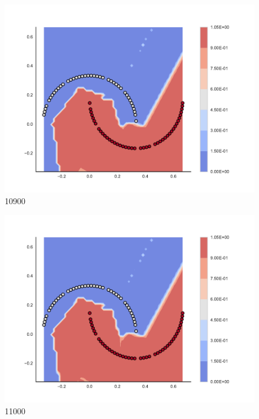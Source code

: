 \begin{subfigure}[b]{0.09\textwidth}
    \includegraphics[clip, trim=2.35cm 1.75cm 4.5cm 0cm,width=\textwidth]{img/convergence/10900.pdf}
    \caption{10900}
    \label{fig:convergence_10900}
\end{subfigure}
%
\begin{subfigure}[b]{0.09\textwidth}
    \includegraphics[clip, trim=2.35cm 1.75cm 4.5cm 0cm,width=\textwidth]{img/convergence/11000.pdf}
    \caption{11000}
    \label{fig:convergence_11000}
\end{subfigure}
%

